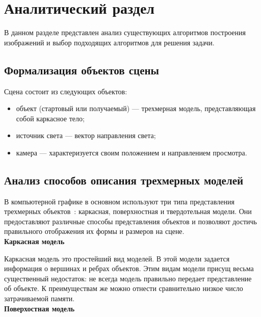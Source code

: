 \chapter{Аналитический раздел}

В данном разделе представлен анализ существующих алгоритмов построения изображений и выбор подходящих алгоритмов для решения задачи.

\section{Формализация объектов сцены}
Сцена состоит из следующих объектов:

\begin{itemize}[label*=---]
	\item объект (стартовый или получаемый) --- трехмерная модель, представляющая собой каркасное тело;
	\item источник света --- вектор направления света;
	\item камера --- характеризуется своим положением и направлением просмотра.
\end{itemize}


\section{Анализ способов описания трехмерных моделей}

В компьютерной графике в основном используют три типа представления трехмерных объектов~\cite{Kosnikov}: каркасная, поверхностная и твердотельная модели.
Они предоставляют различные способы представления объектов и позволяют 
достичь правильного отображения их формы и размеров на сцене.\\ %

\textbf{Каркасная модель} %

Каркасная модель это простейший вид моделей. В этой модели задается информация о вершинах и ребрах объектов. Этим видам модели присущ весьма существенный недостаток: не всегда модель правильно передает представление об объекте. К преимуществам же можно отнести сравнительно низкое число затрачиваемой памяти.\\

\textbf{Поверхостная модель} %

